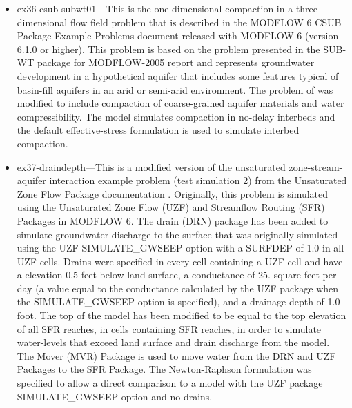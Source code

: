 \begin{itemize}
\item ex36-csub-subwt01---This is the one-dimensional compaction in a three-dimensional flow field problem that is described in the MODFLOW 6 CSUB Package Example Problems document released with MODFLOW 6 (version 6.1.0 or higher). This problem is based on the problem presented in the SUB-WT package for MODFLOW-2005 report \citep{leake2007modflow} and represents groundwater development in a hypothetical aquifer that includes some features typical of basin-fill aquifers in an arid or semi-arid environment. The problem of \cite{leake2007modflow} was modified to include compaction of coarse-grained aquifer materials and water compressibility. The model simulates compaction in no-delay interbeds and the default effective-stress formulation is used to simulate interbed compaction.

\item ex37-draindepth---This is a modified version of the unsaturated zone-stream-aquifer interaction example problem (test simulation 2) from the Unsaturated Zone Flow Package documentation \cite{modflownwt}.  Originally, this problem is simulated using the Unsaturated Zone Flow (UZF) and Streamflow Routing (SFR) Packages in MODFLOW 6. The drain (DRN) package has been added to simulate groundwater discharge to the surface that was originally simulated using the UZF SIMULATE\_GWSEEP option with a SURFDEP of 1.0 in all UZF cells. Drains were specified in every cell containing a UZF cell and have a elevation 0.5 feet below land surface, a conductance of 25. square feet per day (a value equal to the conductance calculated by the UZF package when the SIMULATE\_GWSEEP option is specified), and a drainage depth of 1.0 foot.  The top of the model has been modified to be equal to the top elevation of all SFR reaches, in cells containing SFR reaches, in order to simulate water-levels that exceed land surface and drain discharge from the model. The Mover (MVR) Package is used to move water from the DRN and UZF Packages to the SFR Package. The Newton-Raphson formulation was specified to allow a direct comparison to a model with the UZF package SIMULATE\_GWSEEP option and no drains.

\end{itemize}
    